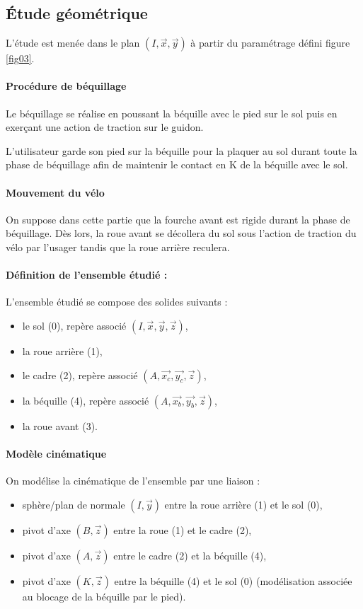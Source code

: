 \subsection{Étude géométrique}

L'étude est menée dans le plan $(I,\vec{x},\vec{y})$ à partir du paramétrage défini figure \ref{fig03}.

\paragraph{Procédure de béquillage} Le béquillage se réalise en poussant la béquille avec le pied sur le sol puis en exerçant une action de traction sur le guidon.

L'utilisateur garde son pied sur la béquille pour la plaquer au sol durant toute la phase de béquillage afin de maintenir le contact en K de la béquille avec le sol.

\paragraph{Mouvement du vélo} On suppose dans cette partie que la fourche avant est rigide durant la phase de béquillage. Dès lors, la roue avant se décollera du sol sous l'action de traction du vélo par l'usager tandis que la roue arrière reculera.

\paragraph{Définition de l'ensemble étudié :} L'ensemble étudié se compose des solides suivants :
\begin{itemize}
 \item le sol (0), repère associé $(I,\vec{x},\vec{y},\vec{z})$,
 \item la roue arrière (1),
 \item le cadre (2), repère associé $(A,\vec{x_c},\vec{y_c},\vec{z})$,
 \item la béquille (4), repère associé $(A,\vec{x_b},\vec{y_b},\vec{z})$,
 \item la roue avant (3).
\end{itemize}

\paragraph{Modèle cinématique} On modélise la cinématique de l'ensemble par une liaison :
\begin{itemize}
 \item sphère/plan de normale $(I,\vec{y})$ entre la roue arrière (1) et le sol (0),
 \item pivot d'axe $(B,\vec{z})$ entre la roue (1) et le cadre (2),
 \item pivot d'axe $(A,\vec{z})$ entre le cadre (2) et la béquille (4),
 \item pivot d'axe $(K,\vec{z})$ entre la béquille (4) et le sol (0) (modélisation associée au blocage de la béquille par le pied).
\end{itemize}

